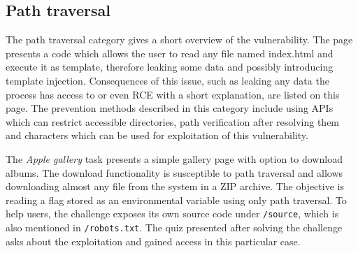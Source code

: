 \subsection{Path traversal}

The path traversal category gives a short overview of the vulnerability. The page presents a code which allows the user to read any file named index.html and execute it as template, therefore leaking some data and possibly introducing template injection. Consequences of this issue, such as leaking any data the process has access to or even RCE with a short explanation, are listed on this page. The prevention methods described in this category include using APIs which can restrict accessible directories, path verification after resolving them and characters which can be used for exploitation of this vulnerability.

The \textit{Apple gallery} task presents a simple gallery page with option to download albums. The download functionality is susceptible to path traversal and allows downloading almost any file from the system in a ZIP archive. The objective is reading a flag stored as an environmental variable using only path traversal. To help users, the challenge exposes its own source code under \texttt{/source}, which is also mentioned in \texttt{/robots.txt}. The quiz presented after solving the challenge asks about the exploitation and gained access in this particular case.
